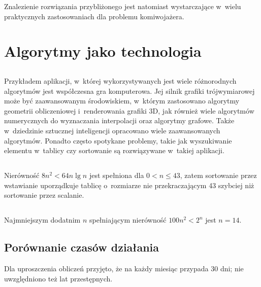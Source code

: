 Znalezienie rozwiązania przybliżonego jest natomiast wystarczające w~wielu praktycznych zastosowaniach dla problemu komiwojażera.

\section{Algorytmy jako technologia}

\subsection{} %
Przykładem aplikacji, w~której wykorzystywanych jest wiele różnorodnych algorytmów jest współczesna gra komputerowa. Jej silnik grafiki trójwymiarowej może być zaawansowanym środowiskiem, w~którym zastosowano algorytmy geometrii obliczeniowej i~renderowania grafiki 3D, jak również wiele algorytmów numerycznych do wyznaczania interpolacji oraz algorytmy grafowe. Także w~dziedzinie sztucznej inteligencji opracowano wiele zaawansowanych algorytmów. Ponadto często spotykane problemy, takie jak wyszukiwanie elementu w~tablicy czy sortowanie są rozwiązywane w~takiej aplikacji.

\subsection{} %
Nierówność $8n^2<64n\lg n$ jest spełniona dla $0<n\le43$, zatem sortowanie przez wstawianie uporządkuje tablicę o~rozmiarze nie przekraczającym 43 szybciej niż sortowanie przez scalanie.

\subsection{} %
Najmniejszym dodatnim $n$ spełniającym nierówność $100n^2<2^n$ jest $n=14$.

\problems

\subsection{Porównanie czasów działania} %

Dla uproszczenia obliczeń przyjęto, że na każdy miesiąc przypada 30 dni; nie uwzględniono też lat przestępnych.

